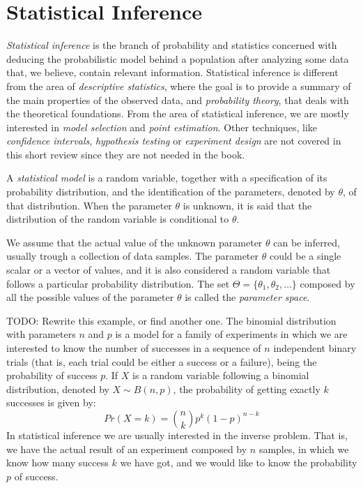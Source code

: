 %
%

\section{Statistical Inference}

\emph{Statistical inference} is the branch of probability and statistics concerned with deducing the probabilistic model behind a population after analyzing some data that, we believe, contain relevant information. Statistical inference is different from the area of \emph{descriptive statistics}, where the goal is to provide a summary of the main properties of the observed data, and \emph{probability theory}, that deals with the theoretical foundations. From the area of statistical inference, we are mostly interested in \emph{model selection} and \emph{point estimation}. Other techniques, like \emph{confidence intervals}, \emph{hypothesis testing} or \emph{experiment design} are not covered in this short review since they are not needed in the book.

\begin{definition}
A \emph{statistical model} is a random variable, together with a specification of its probability distribution, and the identification of the parameters, denoted by $\theta$, of that distribution. When the parameter $\theta$ is unknown, it is said that the distribution of the random variable is conditional to $\theta$.
\end{definition}

We assume that the actual value of the unknown parameter $\theta$ can be inferred, usually trough a collection of data samples. The parameter $\theta$ could be a single scalar or a vector of values, and it is also considered a random variable that follows a particular probability distribution. The set $\Theta = \{ \theta_1, \theta_2, \ldots \}$ composed by all the possible values of the parameter $\theta$ is called the \emph{parameter space}.

\begin{example}
\label{ex:binomial}
{\color{red} TODO: Rewrite this example, or find another one.}
The binomial distribution with parameters $n$ and $p$ is a model for a family of experiments in which we are interested to know the number of successes in a sequence of $n$ independent binary trials (that is, each trial could be either a success or a failure), being the probability of success $p$. If $X$ is a random variable following a binomial distribution, denoted by $X \sim B(n,p)$, the probability of getting exactly $k$ successes is given by:
\[
Pr(X=k) = {\binom {n}{k}}p^{k}(1-p)^{n-k}
\]
In statistical inference we are usually interested in the inverse problem. That is, we have the actual result of an experiment composed by $n$ samples, in which we know how many success $k$ we have got, and we would like to know the probability $p$ of success.
\end {example}

